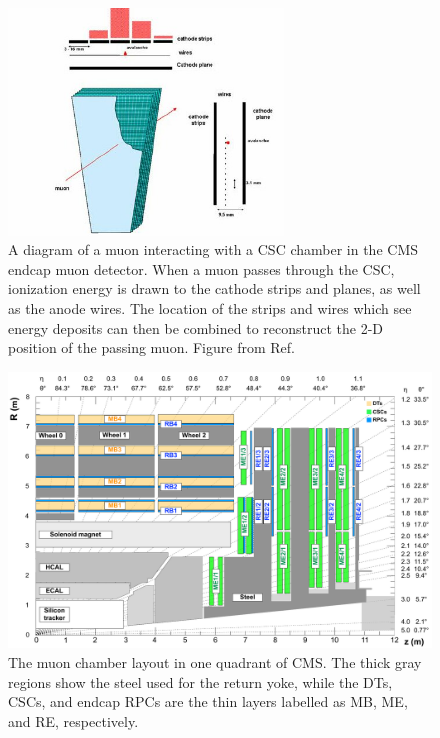 \begin{figure}[htbp]
    \includegraphics[width=0.65\textwidth]{figures/cscInteractionExample.jpg}
    \centering
	\caption[A muon interacting with a CSC chamber]{A diagram of a muon interacting with a CSC chamber in the CMS endcap muon detector. When a muon passes through the CSC, ionization energy is drawn to the cathode strips and planes, as well as the anode wires. The location of the strips and wires which see energy deposits can then be combined to reconstruct the 2-D position of the passing muon. Figure from Ref.~\cite{hauser2004}}
    \label{fig:CSCInteraction}
\end{figure}

\begin{figure}[htbp]
    \includegraphics[width=\textwidth]{figures/cms_quadrant_run_ii.pdf}
    \centering
    \caption[Muon chamber layout in Run 2]{The muon chamber layout in one quadrant of CMS. The thick gray regions show the steel used for the return yoke, while the DTs, CSCs, and endcap RPCs are the thin layers labelled as MB, ME, and RE, respectively.}
    \label{fig:cscLayout}
\end{figure}

